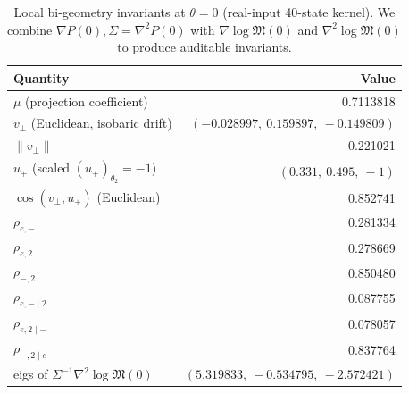 \begin{table}[H]
\centering
\scriptsize
\setlength{\tabcolsep}{8pt}
\renewcommand{\arraystretch}{1.2}
\caption{Local bi-geometry invariants at $\theta=0$ (real-input 40-state kernel). We combine $\nabla P(0),\Sigma=\nabla^2P(0)$ with $\nabla\log\mathfrak{M}(0)$ and $\nabla^2\log\mathfrak{M}(0)$ to produce auditable invariants.}
\label{tab:real-input-40-local-bigeometry-invariants}
\begin{tabular}{@{}l r@{}}
\toprule
Quantity & Value\\
\midrule
$\mu$ (projection coefficient) & 0.7113818\\
$v_\perp$ (Euclidean, isobaric drift) & $(-0.028997,\ 0.159897,\ -0.149809)$\\
$\|v_\perp\|$ & 0.221021\\
$u_+$ (scaled $(u_+)_{\theta_2}=-1$) & $(0.331,\ 0.495,\ -1)$\\
$\cos(v_\perp,u_+)$ (Euclidean) & 0.852741\\
\midrule
$\rho_{e,-}$ & 0.281334\\
$\rho_{e,2}$ & 0.278669\\
$\rho_{-,2}$ & 0.850480\\
\midrule
$\rho_{e,-\mid 2}$ & 0.087755\\
$\rho_{e,2\mid -}$ & 0.078057\\
$\rho_{-,2\mid e}$ & 0.837764\\
\midrule
eigs of $\Sigma^{-1}\nabla^2\log\mathfrak{M}(0)$ & $(5.319833,\ -0.534795,\ -2.572421)$\\
\bottomrule
\end{tabular}
\end{table}
